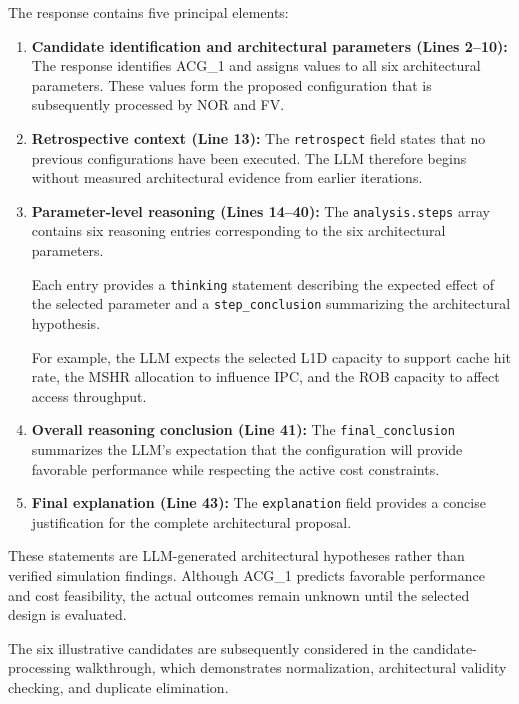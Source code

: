 The response contains five principal
elements:

\begin{enumerate}

\item \textbf{Candidate identification and
architectural parameters (Lines 2--10):}
The response identifies ACG\_1 and assigns
values to all six architectural parameters.
These values form the proposed configuration
that is subsequently processed by NOR and FV.

\item \textbf{Retrospective context (Line 13):}
The \texttt{retrospect} field states that
no previous configurations have been executed.
The LLM therefore begins without measured
architectural evidence from earlier iterations.

\item \textbf{Parameter-level reasoning
(Lines 14--40):}
The \texttt{analysis.steps} array contains
six reasoning entries corresponding to
the six architectural parameters.

Each entry provides a \texttt{thinking}
statement describing the expected effect
of the selected parameter and a
\texttt{step\_conclusion} summarizing
the architectural hypothesis.

For example, the LLM expects the selected
L1D capacity to support cache hit rate,
the MSHR allocation to influence IPC,
and the ROB capacity to affect
access throughput.

\item \textbf{Overall reasoning conclusion
(Line 41):}
The \texttt{final\_conclusion} summarizes
the LLM's expectation that the configuration
will provide favorable performance while
respecting the active cost constraints.

\item \textbf{Final explanation (Line 43):}
The \texttt{explanation} field provides
a concise justification for the complete
architectural proposal.

\end{enumerate}

These statements are LLM-generated
architectural hypotheses rather than
verified simulation findings. Although
ACG\_1 predicts favorable performance
and cost feasibility, the actual outcomes
remain unknown until the selected design
is evaluated.

The six illustrative candidates are
subsequently considered in the
candidate-processing walkthrough,
which demonstrates normalization,
architectural validity checking,
and duplicate elimination.


